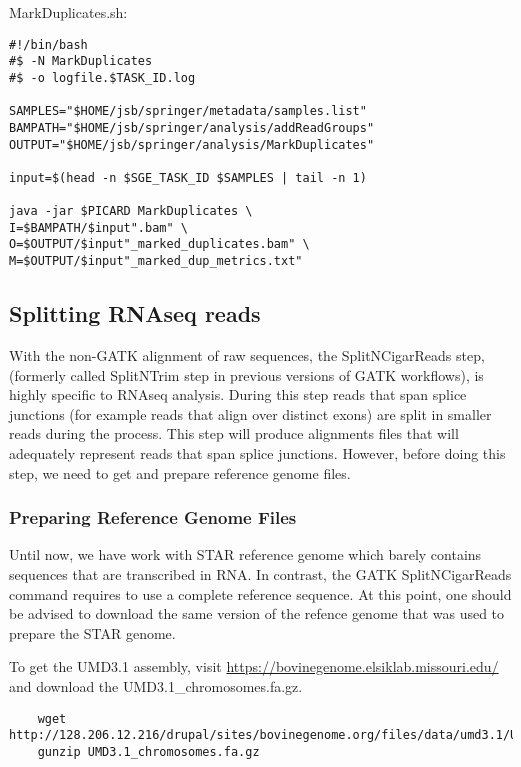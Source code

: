 \noindent MarkDuplicates.sh:
\begin{verbatim}
#!/bin/bash
#$ -N MarkDuplicates
#$ -o logfile.$TASK_ID.log

SAMPLES="$HOME/jsb/springer/metadata/samples.list"
BAMPATH="$HOME/jsb/springer/analysis/addReadGroups"
OUTPUT="$HOME/jsb/springer/analysis/MarkDuplicates"

input=$(head -n $SGE_TASK_ID $SAMPLES | tail -n 1)

java -jar $PICARD MarkDuplicates \
I=$BAMPATH/$input".bam" \
O=$OUTPUT/$input"_marked_duplicates.bam" \
M=$OUTPUT/$input"_marked_dup_metrics.txt"
\end{verbatim}

\subsection{Splitting RNAseq reads}

With the non-GATK alignment of raw sequences, the SplitNCigarReads step, (formerly called SplitNTrim step in previous versions of GATK workflows), is highly specific to RNAseq analysis. During this step reads that span splice junctions (for example reads that align over distinct exons) are split in smaller reads during the process. This step will produce alignments files that will adequately represent reads that span splice junctions. However, before doing this step, we need to get and prepare reference genome files.


\subsubsection{Preparing Reference Genome Files}

Until now, we have work with STAR reference genome which barely contains sequences that are transcribed in RNA. In contrast, the GATK SplitNCigarReads command requires to use a complete reference sequence. At this point, one should be advised to download the same version of the refence genome that was used to prepare the STAR genome.

To get the UMD3.1 assembly, visit \href{https://bovinegenome.elsiklab.missouri.edu/}{https://bovinegenome.elsiklab.missouri.edu/} and download the UMD3.1\_chromosomes.fa.gz.
\begin{verbatim}
	wget http://128.206.12.216/drupal/sites/bovinegenome.org/files/data/umd3.1/UMD3.1_chromosomes.fa.gz
	gunzip UMD3.1_chromosomes.fa.gz
\end{verbatim}


